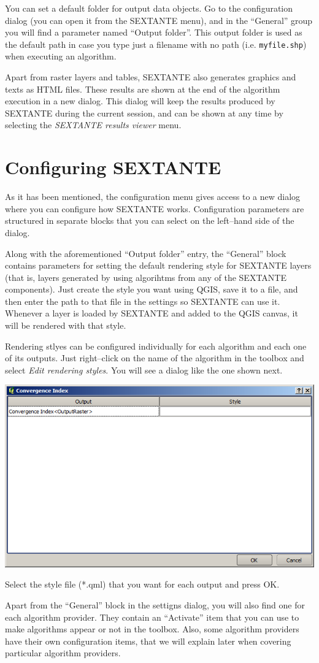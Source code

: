 You can set a default folder for output data objects. Go to the configuration dialog (you can open it from the SEXTANTE menu), and in the ``General'' group you will find a parameter named ``Output folder''. This output folder is used as the default path in case you type just a filename with no path (i.e. \texttt{myfile.shp}) when executing an algorithm. 

Apart from raster layers and tables, SEXTANTE also generates graphics and texts as HTML files. These results are shown at the end of the algorithm execution in a new dialog. This dialog will keep the results produced by SEXTANTE during the current session, and can be shown at any time by selecting the \emph{SEXTANTE results viewer} menu.

\section{Configuring SEXTANTE}

As it has been mentioned, the configuration menu gives access to a new dialog where you can configure how SEXTANTE works. Configuration parameters are structured in separate blocks that you can select on the left--hand side of the dialog.

Along with the aforementioned ``Output folder'' entry, the ``General'' block contains parameters for setting the default rendering style for SEXTANTE layers (that is, layers generated by using algorihtms from any of the SEXTANTE components). Just create the style you want using QGIS, save it to a file, and then enter the path to that file in the settings so SEXTANTE can use it. Whenever a layer is loaded by SEXTANTE and added to the QGIS canvas, it will be rendered with that style.

Rendering stlyes can be configured individually for each algorithm and each one of its outputs. Just right--click on the name of the algorithm in the toolbox and select \emph{Edit rendering styles}. You will see a dialog like the one shown next.

\begin{center}
\includegraphics[width=.6\columnwidth]{rendering_styles.png}
\end{center}

Select the style file (*.qml) that you want for each output and press OK.

Apart from the ``General'' block in the settigns dialog, you will also find one for each algorithm provider. They contain an ``Activate'' item that you can use to make algorithms appear or not in the toolbox. Also, some algorithm providers have their own configuration items, that we will explain later when covering particular algorithm providers.
